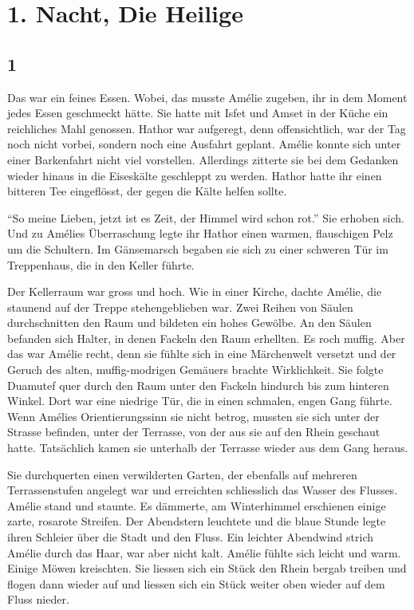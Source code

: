 \documentclass[11pt,titlepage,a5paper]{book}
\begin{document}
\chapter*{1. Nacht, Die Heilige}

\section*{1}

Das war ein feines Essen. Wobei, das musste Amélie zugeben, ihr in dem Moment jedes Essen geschmeckt hätte. Sie hatte mit Isfet und Amset in der Küche ein reichliches Mahl genossen. Hathor war aufgeregt, denn offensichtlich, war der Tag noch nicht vorbei, sondern noch eine Ausfahrt geplant. Amélie konnte sich unter einer Barkenfahrt nicht viel vorstellen. Allerdings zitterte sie bei dem Gedanken wieder hinaus in die Eiseskälte geschleppt zu werden. Hathor hatte ihr einen bitteren Tee eingeflösst, der gegen die Kälte helfen sollte.

"`So meine Lieben, jetzt ist es Zeit, der Himmel wird schon rot."' Sie erhoben sich. Und zu Amélies Überraschung legte ihr Hathor einen warmen, flauschigen Pelz um die Schultern. Im Gänsemarsch begaben sie sich zu einer schweren Tür im Treppenhaus, die in den Keller führte. 

Der Kellerraum war gross und hoch. Wie in einer Kirche, dachte Amélie, die staunend auf der Treppe stehengeblieben war. Zwei Reihen von Säulen durchschnitten den Raum und bildeten ein hohes Gewölbe. An den Säulen befanden sich Halter, in denen Fackeln den Raum erhellten. Es roch muffig. Aber das war Amélie recht, denn sie fühlte sich in eine Märchenwelt versetzt und der Geruch des alten, muffig-modrigen Gemäuers brachte Wirklichkeit. Sie folgte Duamutef quer durch den Raum unter den Fackeln hindurch bis zum hinteren Winkel. Dort war eine niedrige Tür, die in einen schmalen, engen Gang führte. Wenn Amélies Orientierungssinn sie nicht betrog, mussten sie sich unter der Strasse befinden, unter der Terrasse, von der aus sie auf den Rhein geschaut hatte. Tatsächlich kamen sie unterhalb der Terrasse wieder aus dem Gang heraus. 

Sie durchquerten einen verwilderten Garten, der ebenfalls auf mehreren Terrassenstufen angelegt war und erreichten schliesslich das Wasser des Flusses. Amélie stand und staunte. Es dämmerte, am Winterhimmel erschienen einige zarte, rosarote Streifen. Der Abendstern leuchtete und die blaue Stunde legte ihren Schleier über die Stadt und den Fluss. Ein leichter Abendwind strich Amélie durch das Haar, war aber nicht kalt. Amélie fühlte sich leicht und warm. Einige Möwen kreischten. Sie liessen sich ein Stück den Rhein bergab treiben und flogen dann wieder auf und liessen sich ein Stück weiter oben wieder auf dem Fluss nieder. 
\end{document}
